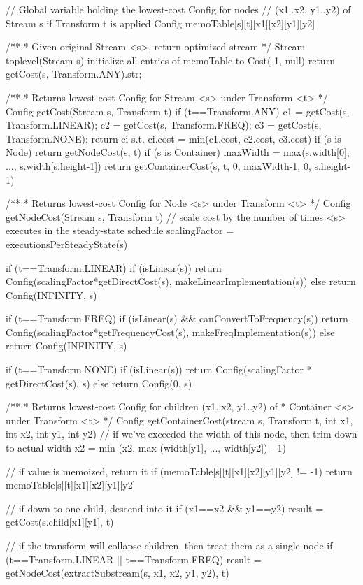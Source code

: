 // Global variable holding the lowest-cost Config for nodes
// (x1..x2, y1..y2) of Stream s if Transform t is applied
Config memoTable[s][t][x1][x2][y1][y2]

/** 
 * Given original Stream <s>, return optimized stream
 */
Stream toplevel(Stream s)
  initialize all entries of memoTable to Cost(-1, null)
  return getCost(s, Transform.ANY).str;

/**
 * Returns lowest-cost Config for Stream <s> under Transform <t>
 */
Config getCost(Stream s, Transform t)
  if (t==Transform.ANY)
    c1 = getCost(s, Transform.LINEAR);
    c2 = getCost(s, Transform.FREQ);
    c3 = getCost(s, Transform.NONE);
    return ci s.t. ci.cost = min(c1.cost, c2.cost, c3.cost)
  if (s is Node)
    return getNodeCost(s, t)
  if (s is Container)
    maxWidth = max(s.width[0], ..., s.width[s.height-1])
    return getContainerCost(s, t, 0, maxWidth-1, 0, s.height-1)

/**
 * Returns lowest-cost Config for Node <s> under Transform <t>
 */ 
Config getNodeCost(Stream s, Transform t)
  // scale cost by the number of times <s> executes in the steady-state schedule
  scalingFactor = executionsPerSteadyState(s)

  if (t==Transform.LINEAR)
    if (isLinear(s))
      return Config(scalingFactor*getDirectCost(s), makeLinearImplementation(s))
    else
      return Config(INFINITY, s)

  if (t==Transform.FREQ)
    if (isLinear(s) && canConvertToFrequency(s))
      return Config(scalingFactor*getFrequencyCost(s), makeFreqImplementation(s))
    else 
      return Config(INFINITY, s)

  if (t==Transform.NONE)
    if (isLinear(s))
      return Config(scalingFactor * getDirectCost(s), s)
    else
      return Config(0, s)

/** 
 * Returns lowest-cost Config for children (x1..x2, y1..y2) of
 * Container <s> under Transform <t>
 */
Config getContainerCost(stream s, Transform t, int x1, int x2, int y1, int y2)
  // if we've exceeded the width of this node, then trim down to actual width
  x2 = min (x2, max (width[y1], ..., width[y2]) - 1)

  // if value is memoized, return it
  if (memoTable[s][t][x1][x2][y1][y2] != -1)
    return memoTable[s][t][x1][x2][y1][y2]

  // if down to one child, descend into it
  if (x1==x2 && y1==y2)
    result = getCost(s.child[x1][y1], t)

  // if the transform will collapse children, then treat them as a single node
  if (t==Transform.LINEAR || t==Transform.FREQ)
    result = getNodeCost(extractSubstream(s, x1, x2, y1, y2), t)

